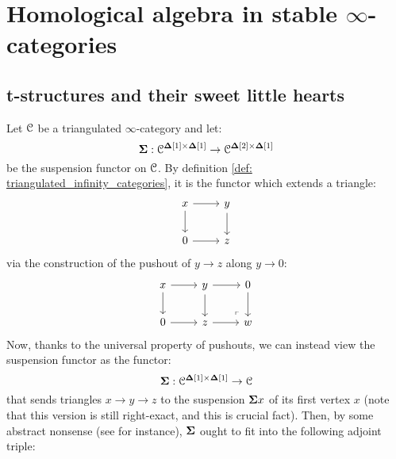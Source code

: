 \section{Homological algebra in stable \texorpdfstring{$\infty$}{}-categories}
    \subsection{t-structures and their sweet little hearts}
        \begin{remark} \label{remark: suspensions_and_loops}
            Let $\mathcal{C}$ be a triangulated $\infty$-category and let:
                $$\suspension: \C^{\simp[1] \x \simp[1]} \to \C^{\simp[2] \x \simp[1]}$$
            be the suspension functor on $\mathcal{C}$. By definition \ref{def: triangulated_infinity_categories}, it is the functor which extends a triangle:
                $$
                    \begin{tikzcd}
                        x & y \\
                        0 & z
                        \arrow[from=1-1, to=2-1]
                        \arrow[from=1-1, to=1-2]
                        \arrow[from=1-2, to=2-2]
                        \arrow[from=2-1, to=2-2]
                    \end{tikzcd}
                $$
            via the construction of the pushout of $y \to z$ along $y \to 0$:
                $$
                    \begin{tikzcd}
                        x & y & 0 \\
                        0 & z & w
                        \arrow[from=1-1, to=2-1]
                        \arrow[from=1-1, to=1-2]
                        \arrow[from=1-2, to=2-2]
                        \arrow[from=2-1, to=2-2]
                        \arrow[from=1-2, to=1-3]
                        \arrow[from=1-3, to=2-3]
                        \arrow[from=2-2, to=2-3]
                        \arrow["\lrcorner"{anchor=center, pos=0.125, rotate=180}, draw=none, from=2-3, to=1-2]
                    \end{tikzcd}
                $$
            Now, thanks to the universal property of pushouts, we can instead view the suspension functor as the functor:
                $$\suspension: \C^{\simp[1] \x \simp[1]} \to \C$$
            that sends triangles $x \to y \to z$ to the suspension $\mathbf{\Sigma} x$ of its first vertex $x$ (note that this version is still right-exact, and this is crucial fact). Then, by some abstract nonsense (see \cite[Section 3]{nlab:infinity-1-limit} for instance), $\mathbf{\Sigma}$ ought to fit into the following adjoint triple:

\end{remark}
